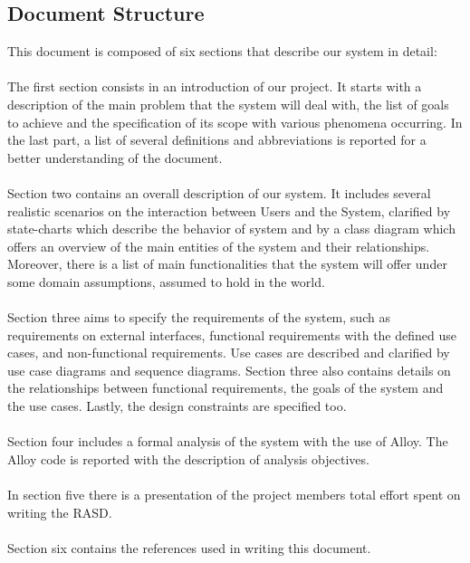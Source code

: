 \documentclass[../main.tex]{subfiles}
\begin{document}
\subsection{Document Structure}

This document is composed of six sections that describe our system in detail: 
\\
\\
The first section consists in an introduction of our project. It starts with a description of the main problem that the system will deal with, the list of goals to achieve and the specification of its scope with various phenomena occurring. In the last part, a list of several definitions and abbreviations is reported for a better understanding of the document.
\\
\\
Section two contains an overall description of our system. It includes several realistic scenarios on the interaction between Users and the System, clarified by state-charts which describe the behavior of system and by a class diagram which offers an overview of the main entities of the system and their relationships. Moreover, there is a list of main functionalities that the system will offer under some domain assumptions, assumed to hold in the world. 
\\
\\
Section three aims to specify the requirements of the system, such as requirements on external interfaces, functional requirements with the defined use cases, and non-functional requirements. Use cases are described and clarified by use case diagrams and sequence diagrams. Section three also contains details on the relationships between functional requirements, the goals of the system and the use cases. Lastly, the design constraints are specified too. 
\\
\\
Section four includes a formal analysis of the system with the use of Alloy. The Alloy code is reported with the description of analysis objectives.
\\
\\
In section five there is a presentation of the project members total effort spent on writing the RASD. 
\\
\\
Section six contains the references used in writing this document. 
\end{document}
